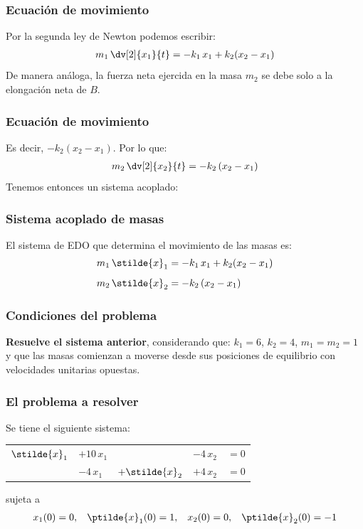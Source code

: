 \begin{frame}
\frametitle{Ecuación de movimiento}
Por la segunda ley de Newton podemos escribir:
\begin{align*}
m_{1} \, \dv[2]{x_{1}}{t} = - k_{1} \, x_{1} + k_{2} (x_{2} - x_{1})
\end{align*}
\pause
De manera análoga, la fuerza neta ejercida en la masa $m_{2}$ se debe solo a la elongación neta de $B$.
\end{frame}
\begin{frame}
\frametitle{Ecuación de movimiento}
Es decir, $-k_{2} (x_{2} - x_{1})$. Por lo que:
\begin{align*}
m_{2} \, \dv[2]{x_{2}}{t} = - k_{2} \, (x_{2} - x_{1})
\end{align*}
\pause
Tenemos entonces un sistema acoplado:
\end{frame}
\begin{frame}
\frametitle{Sistema acoplado de masas}
El sistema de EDO que determina el movimiento de las masas es:
\begin{align*}
m_{1} \, \stilde{x}_{1} &= - k_{1} \, x_{1} + k_{2} (x_{2} - x_{1}) \\[0.5em]
m_{2} \, \stilde{x}_{2} &= - k_{2} \, (x_{2} - x_{1})
\end{align*}
\end{frame}
\begin{frame}
\frametitle{Condiciones del problema}
\textbf{Resuelve el sistema anterior}, considerando que: $k_{1} = 6$, $k_{2} = 4$, $m_{1} = m_{2} = 1$ y que las masas comienzan a moverse desde sus posiciones de equilibrio con velocidades unitarias opuestas.
\end{frame}
\begin{frame}
\frametitle{El problema a resolver}
Se tiene el siguiente sistema:
\begin{table}
\begin{tabular}{l l l l l }
$\stilde{x}_{1}$ & $+ 10 \, x_{1}$ &  & $- 4 \, x_{2}$ & $= 0$ \\[0.5em]
 & $-4 \, x_{1}$ & $+\stilde{x}_{2}$ & $+ 4 \, x_{2}$ & $=0$
\end{tabular}
\end{table}
sujeta a 
\begin{align*}
x_{1}(0) = 0, \hspace{0.3cm} \ptilde{x}_{1}(0) = 1, \hspace{0.3cm} x_{2}(0) = 0, \hspace{0.3cm} \ptilde{x}_{2}(0) = -1
\end{align*}
\end{frame}
